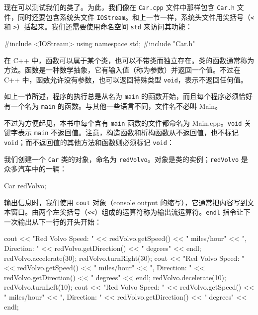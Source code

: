 现在可以测试我们的类了。为此，我们像在 \texttt{Car.cpp} 文件中那样包含 \texttt{Car.h} 文件，同时还要包含系统头文件 \texttt{IOStream}。和上一节一样，系统头文件用尖括号（\texttt{<} 和 \texttt{>}）括起来。我们还需要使用命名空间 \texttt{std} 来访问其功能：

\medskip{}

\begin{codebox}
#include <IOStream>
using namespace std;
#include "Car.h"
\end{codebox}

在 C++ 中，函数可以属于某个类，也可以不带类而独立存在。类的函数通常称为方法。函数是一种数学抽象，它有输入值（称为参数）并返回一个值。不过在 C++ 中，函数允许没有参数，也可以返回特殊类型 \texttt{void}，表示不返回任何值。

如上一节所述，程序的执行总是从名为 \texttt{main} 的函数开始，而且每个程序必须恰好有一个名为 \texttt{main} 的函数。与其他一些语言不同，文件名不必叫 Main。

不过为方便起见，本书中每个含有 \texttt{main} 函数的文件都命名为 Main.cpp。\texttt{void} 关键字表示 \texttt{main} 不返回值。注意，构造函数和析构函数从不返回值，也不标记 \texttt{void}；而不返回值的其他方法和函数则必须标记 \texttt{void}：

\begin{codebox}
void main() {
\end{codebox}

我们创建一个 \texttt{Car} 类的对象，命名为 \texttt{redVolvo}。对象是类的实例；\texttt{redVolvo} 是众多汽车中的一辆：

\begin{codebox}
  Car redVolvo;
\end{codebox}

输出信息时，我们使用 \texttt{cout} 对象（console output 的缩写），它通常把内容写到文本窗口。由两个左尖括号（\texttt{<<}）组成的运算符称为输出流运算符。\texttt{endl} 指令让下一次输出从下一行的开头开始：

\begin{codebox}
  cout << "Red Volvo Speed: " << redVolvo.getSpeed()
       << " miles/hour" << ", Direction: "
       << redVolvo.getDirection() << " degrees" << endl;
  redVolvo.accelerate(30);
  redVolvo.turnRight(30);
  cout << "Red Volvo Speed: " << redVolvo.getSpeed()
       << " miles/hour" << ", Direction: "
       << redVolvo.getDirection() << " degrees" << endl;
  redVolvo.decelerate(10);
  redVolvo.turnLeft(10);
  cout << "Red Volvo Speed: " << redVolvo.getSpeed()
       << " miles/hour" << ", Direction: "
       << redVolvo.getDirection() << " degrees" << endl;
\end{codebox}

